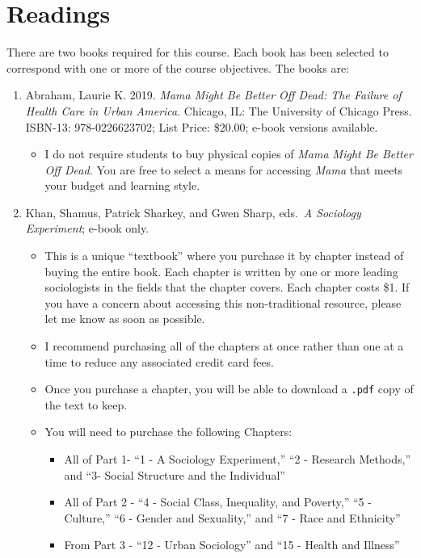 \documentclass[
]{book}
\providecommand{\tightlist}{%
  \setlength{\itemsep}{0pt}\setlength{\parskip}{0pt}}
\begin{document}
\hypertarget{readings}{%
\section{Readings}\label{readings}}

There are two books required for this course. Each book has been selected to correspond with one or more of the course objectives. The books are:

\begin{enumerate}
\def\labelenumi{\arabic{enumi}.}
\tightlist
\item
  Abraham, Laurie K. 2019. \emph{Mama Might Be Better Off Dead: The Failure of Health Care in Urban America}. Chicago, IL: The University of Chicago Press. ISBN-13: 978-0226623702; List Price: \$20.00; e-book versions available.

  \begin{itemize}
  \tightlist
  \item
    I do not require students to buy physical copies of \emph{Mama Might Be Better Off Dead.} You are free to select a means for accessing \emph{Mama} that meets your budget and learning style.
  \end{itemize}
\item
  Khan, Shamus, Patrick Sharkey, and Gwen Sharp, eds.~\emph{A Sociology Experiment}; e-book only.

  \begin{itemize}
  \tightlist
  \item
    This is a unique ``textbook'' where you purchase it by chapter instead of buying the entire book. Each chapter is written by one or more leading sociologists in the fields that the chapter covers. Each chapter costs \$1. If you have a concern about accessing this non-traditional resource, please let me know as soon as possible.
  \item
    I recommend purchasing all of the chapters at once rather than one at a time to reduce any associated credit card fees.
  \item
    Once you purchase a chapter, you will be able to download a \texttt{.pdf} copy of the text to keep.
  \item
    You will need to purchase the following Chapters:

    \begin{itemize}
    \tightlist
    \item
      All of Part 1- ``1 - A Sociology Experiment,'' ``2 - Research Methods,'' and ``3- Social Structure and the Individual''
    \item
      All of Part 2 - ``4 - Social Class, Inequality, and Poverty,'' ``5 - Culture,'' ``6 - Gender and Sexuality,'' and ``7 - Race and Ethnicity''
    \item
      From Part 3 - ``12 - Urban Sociology'' and ``15 - Health and Illness''
    \end{itemize}
  \end{itemize}
\end{enumerate}
\end{document}

